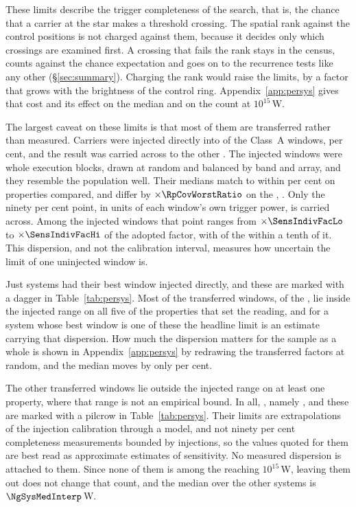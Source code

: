 These limits describe the trigger completeness of the search, that is, the
chance that a carrier at the star makes a threshold crossing. The spatial
rank against the \NCtrl{} control positions is not charged against them,
because it decides only which crossings are examined first. A crossing that
fails the rank stays in the census, counts against the chance expectation
and goes on to the recurrence tests like any other (\S\ref{sec:summary}).
Charging the rank would raise the limits, by a factor that grows with the
brightness of the control ring. Appendix~\ref{app:persys} gives that cost
and its effect on the median and on the count at $10^{15}$\,W.

The largest caveat on these limits is that most of them are transferred
rather than measured. Carriers were injected directly into \SensNInj{} of
the \NWinA{} Class~A windows, \SensNInjPct{} per cent, and the result was
carried across to the other \SensNTransfer. The injected windows were whole
execution blocks, drawn at random and balanced by band and array, and they
resemble the population well. Their medians match to within
\RpCovOtherPct{} per cent on \RpCovOtherOf{} properties compared, and
differ by $\times\RpCovWorstRatio$ on the \RpCovWorstOrd, \RpCovWorstAxis.
Only the ninety per cent point, in units of each
window's own trigger power, is carried across. Among the injected windows
that point ranges from $\times\SensIndivFacLo$ to $\times\SensIndivFacHi$ of
the adopted factor, with \NmDispNTenth{} of the \SensNInj{} within a tenth of
it. This dispersion, and not the calibration interval, measures how
uncertain the limit of one uninjected window is.

Just \SmcNMeasSys{} systems had their best window injected directly, and
these are marked with a dagger in Table~\ref{tab:persys}. Most of the transferred windows,
\NgNInterpWin{} of the \SensNTransfer, lie inside the injected range on all
five of the properties that set the reading, and for a system whose best
window is one of these the headline limit is an estimate carrying that
dispersion. How much the dispersion matters for the sample as a whole is
shown in Appendix~\ref{app:persys} by redrawing the transferred factors at
random, and the median moves by only \SvRsMedShiftPct{} per cent.

The other \NgNExtrapWin{} transferred windows lie outside the injected range
on at least one property, where that range is not an empirical bound. In
all, \NgExtrapTakeClause, namely \NgExtrapSys, and these are marked with a
pilcrow in Table~\ref{tab:persys}. Their limits are extrapolations of the
injection calibration through a model, and not ninety per cent completeness
measurements bounded by injections, so the values quoted for them are best
read as approximate estimates of sensitivity. No measured dispersion is
attached to them. Since none of them is among the \NSysEfifteen{} reaching
$10^{15}$\,W, leaving them out does not change that count, and the median
over the other \NgNSysInterpSum{} systems is $\NgSysMedInterp$\,W.

